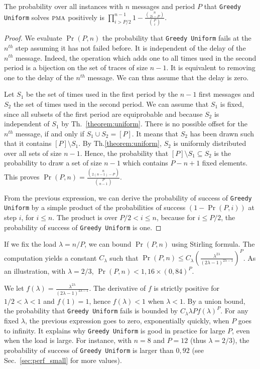 \documentclass[a4paper,UKenglish,cleveref, autoref, thm-restate]{lipics-v2019}
\newcommand\pma{\textsc{pma}\xspace}
\newcommand\greedyuniform{\texttt{Greedy Uniform}\xspace}
\begin{document}
\begin{theorem}
The probability over all instances with $n$ messages and period $P$ that \greedyuniform solves $\pma$ positively is $\displaystyle{\prod_{i > P/2}^{n-1}1 - \frac{\binom{n}{2i-P}}{\binom{P}{i}}}$.
\end{theorem}
\begin{proof}
We evaluate $\Pr(P,n)$ the probability that \greedyuniform fails at the $n^{th}$ step assuming it has not failed before. It is independent of the delay of the $n^{th}$ message. Indeed, the operation which adds one to all times used in the second period is a bijection on the set of traces of size $n-1$. It is equivalent to removing one to the delay of the $n^{th}$ message. We can thus assume that the delay is zero.

Let $S_1$ be the set of times used in the first period by the $n-1$ first messages
and $S_2$ the set of times used in the second period. We can assume that $S_1$ is fixed, since all subsets of the first period are equiprobable and because $S_2$ is independent of $S_1$ by Th.~\ref{theorem:uniform}. There is no possible offset for the $n^{th}$ message, if and only if $S_1 \cup S_2 = [P]$. It means that $S_2$ has been drawn such that it contains $[P] \setminus S_1$. By Th.\ref{theorem:uniform}, $S_2$ is uniformly distributed over all sets of size $n-1$. Hence, the probability that  $[P]  \setminus S_1 \subseteq S_2$  is the probability to draw a set of size $n-1$ which contains $P-n + 1$ fixed elements. This proves $\Pr(P,n) = \frac{\binom{n}{2(n-1)-P}}{\binom{P}{n-1}}$.

From the previous expression, we can derive the probability of success of \greedyuniform by a simple product of the probabilities of success $(1 - \Pr(P,i))$ at step $i$, for $i \leq n$. The product is over $ P/2 < i \leq n$, because for $i \leq P/2$, the probability of success of \greedyuniform is one. 
\end{proof}


If we fix the load $\lambda = n/P$, we can bound $\Pr(P,n)$ using Stirling formula. The computation yields a constant $C_{\lambda}$
such that $\Pr(P,n) \leq C_{\lambda} \left(\frac{\lambda^{2\lambda}}{(2\lambda -1)^{2\lambda -1}}\right)^P$.
As an illustration, with $\lambda = 2/3$, $\Pr(P,n) < 1,16 \times (0,84)^P$.

We let $f(\lambda) = \frac{\lambda^{2\lambda}}{(2\lambda -1)^{2\lambda -1}}$.
The derivative of $f$ is strictly positive for $1/2 < \lambda < 1$ and $f(1) = 1$, hence 
$f(\lambda) < 1$ when $\lambda < 1$. By a union bound, the probability that \greedyuniform fails is bounded by $C_{\lambda} \lambda P f(\lambda)^P$. For any fixed $\lambda$, the previous expression goes to zero, exponentially quickly, when $P$ goes to infinity. It explains why \greedyuniform is good in practice for large $P$, even when the load is large. 
For instance, with $n = 8$ and $P=12$ (thus $\lambda = 2/3$), the probability of success of \greedyuniform is larger than $0,92$ (see Sec.~\ref{sec:perf_small} for more values).
\end{document}
